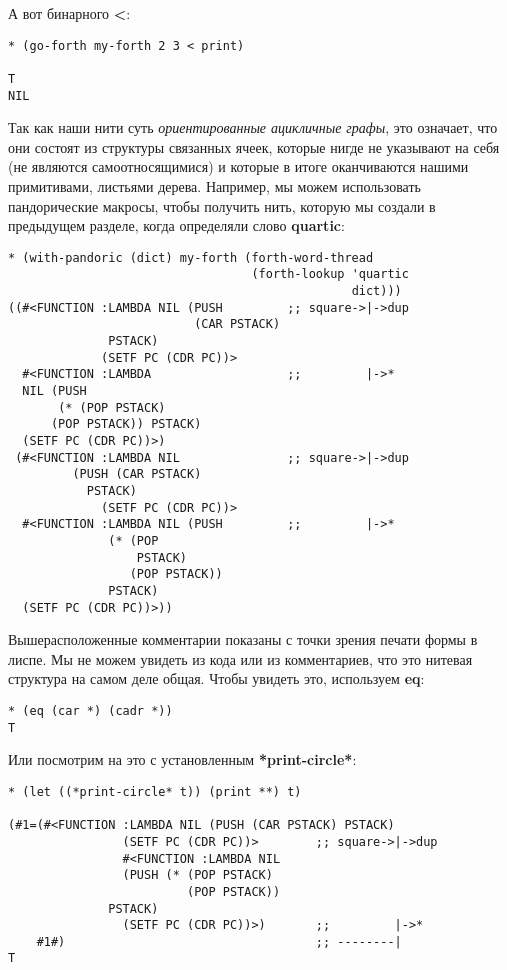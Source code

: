 А вот  бинарного \textbf{<}:

\begin{verbatim}
* (go-forth my-forth 2 3 < print)

T 
NIL
\end{verbatim}

Так как наши нити суть \emph{ориентированные ацикличные графы}, это означает, что они состоят из структуры связанных ячеек, которые нигде не указывают на себя (не являются самоотносящимися) и которые в итоге оканчиваются нашими примитивами, листьями дерева. Например, мы можем использовать пандорические макросы, чтобы получить нить, которую мы создали в предыдущем разделе, когда определяли слово \textbf{quartic}:

\begin{verbatim}
* (with-pandoric (dict) my-forth (forth-word-thread
                                  (forth-lookup 'quartic
                                                dict)))
((#<FUNCTION :LAMBDA NIL (PUSH         ;; square->|->dup
                          (CAR PSTACK)
			  PSTACK)
             (SETF PC (CDR PC))>
  #<FUNCTION :LAMBDA                   ;;         |->*
  NIL (PUSH
       (* (POP PSTACK)
	  (POP PSTACK)) PSTACK)
  (SETF PC (CDR PC))>)
 (#<FUNCTION :LAMBDA NIL               ;; square->|->dup
	     (PUSH (CAR PSTACK)
		   PSTACK)
             (SETF PC (CDR PC))>
  #<FUNCTION :LAMBDA NIL (PUSH         ;;         |->*
			  (* (POP
			      PSTACK)
			     (POP PSTACK))
			  PSTACK)
  (SETF PC (CDR PC))>))
\end{verbatim}

Вышерасположенные комментарии показаны с точки зрения печати формы в лиспе. Мы не можем увидеть из кода или из комментариев, что это нитевая структура на самом деле общая. Чтобы увидеть это, используем \textbf{eq}:

\begin{verbatim}
* (eq (car *) (cadr *))
T
\end{verbatim}

Или посмотрим на это с установленным \textbf{*print-circle*}:

\begin{verbatim}
* (let ((*print-circle* t)) (print **) t)

(#1=(#<FUNCTION :LAMBDA NIL (PUSH (CAR PSTACK) PSTACK)
                (SETF PC (CDR PC))>        ;; square->|->dup
                #<FUNCTION :LAMBDA NIL
                (PUSH (* (POP PSTACK)
                         (POP PSTACK))
		      PSTACK)
                (SETF PC (CDR PC))>)       ;;         |->*
    #1#)                                   ;; --------|
T
\end{verbatim}

